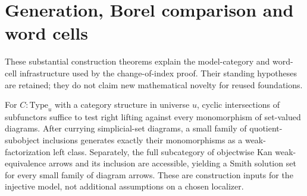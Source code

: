 \section{Generation, Borel comparison and word cells}

These substantial construction theorems explain the model-category and word-cell infrastructure used by the change-of-index proof. Their standing hypotheses are retained; they do not claim new mathematical novelty for reused foundations.

\begin{resultblock}
\begin{proposition}
\label{catalogue:I1}
For $C:\mathrm{Type}_u$ with a category structure in universe $u$, cyclic intersections of subfunctors suffice to test right lifting against every monomorphism of set-valued diagrams.
After currying simplicial-set diagrams, a small family of quotient-subobject inclusions generates exactly their monomorphisms as a weak-factorization left class.
Separately, the full subcategory of objectwise Kan weak-equivalence arrows and its inclusion are accessible, yielding a Smith solution set for every small family of diagram arrows.
These are construction inputs for the injective model, not additional assumptions on a chosen localizer.
\end{proposition}

\end{resultblock}

